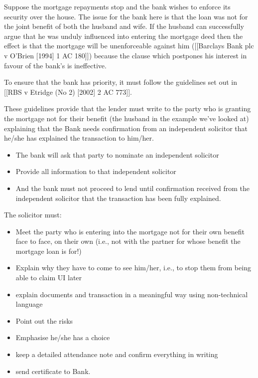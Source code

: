 \documentclass[
]{article}
\providecommand{\tightlist}{%
  \setlength{\itemsep}{0pt}\setlength{\parskip}{0pt}}
\begin{document}
Suppose the mortgage repayments stop and the bank wishes to enforce its
security over the house. The issue for the bank here is that the loan
was not for the joint benefit of both the husband and wife. If the
husband can successfully argue that he was unduly influenced into
entering the mortgage deed then the effect is that the mortgage will be
unenforceable against him ({[}{[}Barclays Bank plc v O'Brien {[}1994{]}
1 AC 180{]}{]}) because the clause which postpones his interest in
favour of the bank's is ineffective.

To ensure that the bank has priority, it must follow the guidelines set
out in {[}{[}RBS v Etridge (No 2) {[}2002{]} 2 AC 773{]}{]}.

These guidelines provide that the lender must write to the party who is
granting the mortgage not for their benefit (the husband in the example
we've looked at) explaining that the Bank needs confirmation from an
independent solicitor that he/she has explained the transaction to
him/her.

\begin{itemize}
\tightlist
\item
  The bank will ask that party to nominate an independent solicitor
\item
  Provide all information to that independent solicitor
\item
  And the bank must not proceed to lend until confirmation received from
  the independent solicitor that the transaction has been fully
  explained.
\end{itemize}

The solicitor must:

\begin{itemize}
\tightlist
\item
  Meet the party who is entering into the mortgage not for their own
  benefit face to face, on their own (i.e., not with the partner for
  whose benefit the mortgage loan is for!)
\item
  Explain why they have to come to see him/her, i.e., to stop them from
  being able to claim UI later
\item
  explain documents and transaction in a meaningful way using
  non-technical language
\item
  Point out the risks
\item
  Emphasise he/she has a choice
\item
  keep a detailed attendance note and confirm everything in writing
\item
  send certificate to Bank.
\end{itemize}
\end{document}
